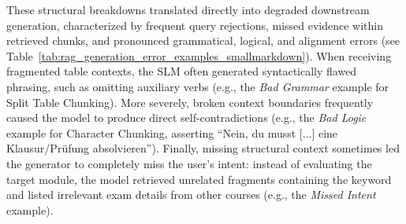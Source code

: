 \documentclass[12pt]{article} %
\begin{document}
These structural breakdowns translated directly into degraded downstream generation, characterized by frequent query rejections, missed evidence within retrieved chunks, and pronounced grammatical, logical, and alignment errors (see Table~\ref{tab:rag_generation_error_examples_smallmarkdown}).
When receiving fragmented table contexts, the SLM often generated syntactically flawed phrasing, such as omitting auxiliary verbs (e.g., the \textit{Bad Grammar} example for Split Table Chunking). More severely, broken context boundaries frequently caused the model to produce direct self-contradictions (e.g., the \textit{Bad Logic} example for Character Chunking, asserting "`Nein, du musst [...] eine Klausur/Prüfung absolvieren"').
Finally, missing structural context sometimes led the generator to completely miss the user's intent: instead of evaluating the target module, the model retrieved unrelated fragments containing the keyword and listed irrelevant exam details from other courses (e.g., the \textit{Missed Intent} example).
\end{document}
